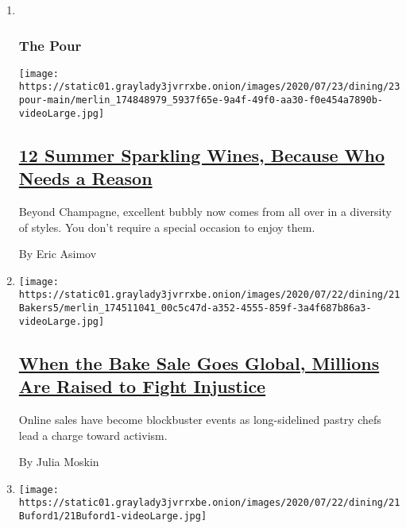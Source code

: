 \begin{enumerate}
\def\labelenumi{\arabic{enumi}.}
\item ~
  \hypertarget{the-pour}{%
  \subsubsection{The Pour}\label{the-pour}}

  \texttt{[image: https://static01.graylady3jvrrxbe.onion/images/2020/07/23/dining/23pour-main/merlin\_174848979\_5937f65e-9a4f-49f0-aa30-f0e454a7890b-videoLarge.jpg]}

  \hypertarget{12-summer-sparkling-wines-because-who-needs-a-reason}{%
  \subsection{\texorpdfstring{\href{/2020/07/23/dining/drinks/best-sparkling-wines.html}{12
  Summer Sparkling Wines, Because Who Needs a
  Reason}}{12 Summer Sparkling Wines, Because Who Needs a Reason}}\label{12-summer-sparkling-wines-because-who-needs-a-reason}}

  Beyond Champagne, excellent bubbly now comes from all over in a
  diversity of styles. You don't require a special occasion to enjoy
  them.

  By Eric Asimov
\item
  \texttt{[image: https://static01.graylady3jvrrxbe.onion/images/2020/07/22/dining/21Bakers5/merlin\_174511041\_00c5c47d-a352-4555-859f-3a4f687b86a3-videoLarge.jpg]}

  \hypertarget{when-the-bake-sale-goes-global-millions-are-raised-to-fight-injustice}{%
  \subsection{\texorpdfstring{\href{/2020/07/21/dining/bake-sale-activism-racism.html}{When
  the Bake Sale Goes Global, Millions Are Raised to Fight
  Injustice}}{When the Bake Sale Goes Global, Millions Are Raised to Fight Injustice}}\label{when-the-bake-sale-goes-global-millions-are-raised-to-fight-injustice}}

  Online sales have become blockbuster events as long-sidelined pastry
  chefs lead a charge toward activism.

  By Julia Moskin
\item
  \texttt{[image: https://static01.graylady3jvrrxbe.onion/images/2020/07/22/dining/21Buford1/21Buford1-videoLarge.jpg]}

  \hypertarget{zooming-in-on-bill-bufords-latest-obsession}{%
}
\end{enumerate}

